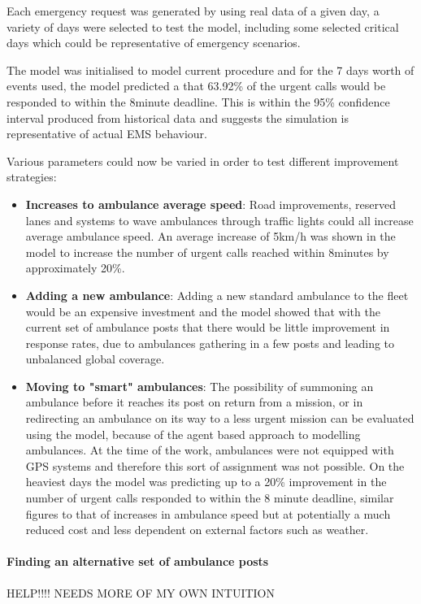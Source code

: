 \documentclass[11pt]{article} %
\begin{document}
Each emergency request was generated by using real data of a given day, a variety of days were selected to test the model, including some selected critical days which could be representative of emergency scenarios. 

The model was initialised to model current procedure and for the 7 days worth of events used, the model predicted a that 63.92\% of the urgent calls would be responded to within the 8minute deadline. This is within the 95\% confidence interval produced from historical data and suggests the simulation is representative of actual EMS behaviour. 

Various parameters could now be varied in order to test different improvement strategies:
\begin{itemize}
	\item \textbf{Increases to  ambulance average speed}: Road improvements, reserved lanes and systems to wave ambulances through traffic lights could all increase average ambulance speed. An average increase of 5km/h was shown in the model to increase the number of urgent calls reached within 8minutes by approximately 20\%.
	\item \textbf{Adding a new ambulance}:  Adding a new standard ambulance to the fleet would be an expensive investment and the model showed that with the current set of ambulance posts that there would be little improvement in response rates, due to ambulances gathering in a few posts and leading to unbalanced global coverage. 
	\item \textbf{Moving to "smart" ambulances}: The possibility of summoning an ambulance before it reaches its post on return from a mission, or in redirecting an ambulance on its way to a less urgent mission can be evaluated using the model, because of the agent based approach to modelling ambulances. At the time of the work, ambulances were not equipped with GPS systems and therefore this sort of assignment was not possible. On the heaviest days the model was predicting up to a 20\% improvement in the number of urgent calls responded to within the 8 minute deadline, similar figures to that of increases in ambulance speed but at potentially a much reduced cost and less dependent on external factors such as weather. 
\end{itemize}

\paragraph{Finding an alternative set of ambulance posts}
HELP!!!! NEEDS MORE OF MY OWN INTUITION 
\end{document}
